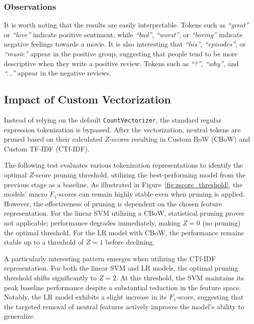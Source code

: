 \documentclass[a4paper,twoside,12pt]{book}
\newcommand{\zscore}{Z}
\newcommand{\logreg}{LR}
\newcommand{\code}[1]{\texttt{#1}}
\newcommand{\customtfidf}{CTf-IDF}
\newcommand{\custombow}{CBoW}
\newcommand{\literal}[1]{\textit{``#1''}}
\begin{document}
\subsubsection{Observations}
It is worth noting that the results are easily interpretable. Tokens such as \literal{great} or \literal{love} indicate positive sentiment, while \literal{bad}, \literal{worst}, or \literal{boring} indicate negative feelings towards a movie. It is also interesting that \literal{his}, \literal{episodes}, or \literal{music} appear in the positive group, suggesting that people tend to be more descriptive when they write a positive review. Tokens such as \literal{?}, \literal{why}, and \literal{...} appear in the negative reviews.

\subsection{Impact of Custom Vectorization} \label{sec:Impact-of-Custom-Vectorization}

Instead of relying on the default \code{CountVectorizer}, the standard regular expression tokenization is bypassed. After the vectorization, neutral tokens are pruned based on their calculated $\zscore$-scores resulting in Custom BoW (\custombow) and Custom TF-IDF (\customtfidf).

The following test evaluates various tokenization representations to identify the optimal $\zscore$-score pruning threshold, utilizing the best-performing model from the previous stage as a baseline. As illustrated in Figure~\ref{fig:zscore_threshold}, the models' macro $F_1$-scores can remain highly stable even when pruning is applied. However, the effectiveness of pruning is dependent on the chosen feature representation. For the linear SVM utilizing a \custombow{}, statistical pruning proves not applicable; performance degrades immediately, making $\zscore=0$ (no pruning) the optimal threshold. For the \logreg{} model with \custombow{}, the performance remains stable up to a threshold of $\zscore=1$ before declining.

A particularly interesting pattern emerges when utilizing the \customtfidf{} representation. For both the linear SVM and \logreg{} models, the optimal pruning threshold shifts significantly to $\zscore=2$. At this threshold, the SVM maintains its peak baseline performance despite a substantial reduction in the feature space. Notably, the \logreg{} model exhibits a slight increase in its $F_1$-score, suggesting that the targeted removal of neutral features actively improves the model's ability to generalize.
\end{document}
